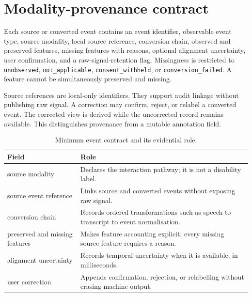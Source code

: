 \documentclass[11pt,a4paper]{article}
\newcommand{\code}[1]{\texttt{#1}}
\begin{document}
\section{Modality-provenance contract}
Each source or converted event contains an event identifier, observable event type, source modality, local source reference, conversion chain, observed and preserved features, missing features with reasons, optional alignment uncertainty, user confirmation, and a raw-signal-retention flag. Missingness is restricted to \code{unobserved}, \code{not_applicable}, \code{consent_withheld}, or \code{conversion_failed}. A feature cannot be simultaneously preserved and missing.

Source references are local-only identifiers. They support audit linkage without publishing raw signal. A correction may confirm, reject, or relabel a converted event. The corrected view is derived while the uncorrected record remains available. This distinguishes provenance from a mutable annotation field.

\begin{table}
\centering
\caption{Minimum event contract and its evidential role.}\label{tab:contract}
\begin{tabular}{p{42mm}p{104mm}}
\toprule
Field & Role \\
\midrule
source modality & Declares the interaction pathway; it is not a disability label. \\
source event reference & Links source and converted events without exposing raw signal. \\
conversion chain & Records ordered transformations such as speech to transcript to event normalisation. \\
preserved and missing features & Makes feature accounting explicit; every missing source feature requires a reason. \\
alignment uncertainty & Records temporal uncertainty when it is available, in milliseconds. \\
user correction & Appends confirmation, rejection, or relabelling without erasing machine output. \\
\bottomrule
\end{tabular}
\end{table}
\end{document}
